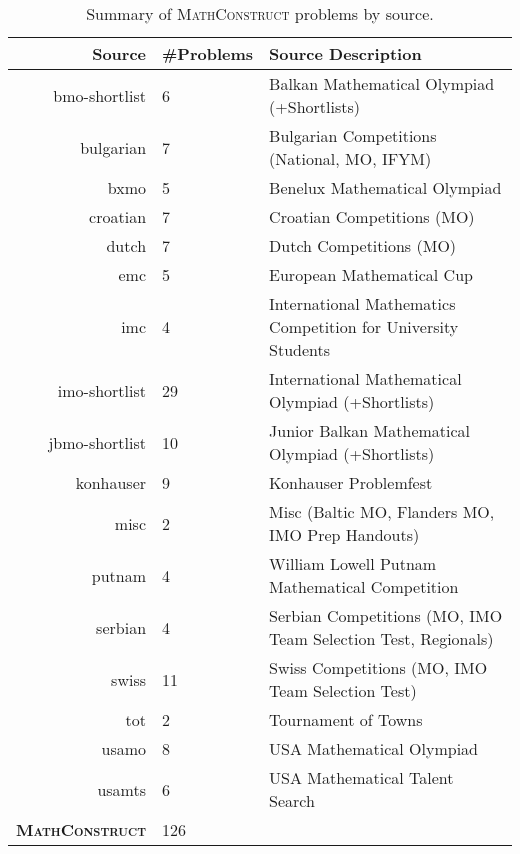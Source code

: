 \begin{table*}[h] \centering 
    
    \caption{Summary of \textsc{MathConstruct} problems by source.}
    \label{tab:bench_summary}

        \begin{tabular}{r
    x{3}{0}
    l}
    \toprule
    \textbf{Source} & \textbf{\#Problems} & \textbf{Source Description} \\
    \midrule
    bmo-shortlist & 6 & Balkan Mathematical Olympiad (+Shortlists) \\
    bulgarian & 7 & Bulgarian Competitions (National, MO, IFYM) \\
    bxmo & 5 & Benelux Mathematical Olympiad \\
    croatian & 7 & Croatian Competitions (MO) \\
    dutch & 7 & Dutch Competitions (MO) \\
    emc & 5 & European Mathematical Cup \\
    imc & 4 & International Mathematics Competition for University Students \\
    imo-shortlist & 29 & International Mathematical Olympiad (+Shortlists) \\
    jbmo-shortlist & 10 & Junior Balkan Mathematical Olympiad (+Shortlists) \\
    konhauser & 9 & Konhauser Problemfest \\
    misc & 2 & Misc (Baltic MO, Flanders MO, IMO Prep Handouts) \\
    putnam & 4 & William Lowell Putnam Mathematical Competition \\
    serbian & 4 & Serbian Competitions (MO, IMO Team Selection Test, Regionals) \\
    swiss & 11 & Swiss Competitions (MO, IMO Team Selection Test) \\
    tot & 2 & Tournament of Towns \\
    usamo & 8 & USA Mathematical Olympiad \\
    usamts & 6 & USA Mathematical Talent Search \\
    \midrule
    \textbf{\textsc{MathConstruct}} & 126 \\
    \bottomrule \end{tabular}
\end{table*}
